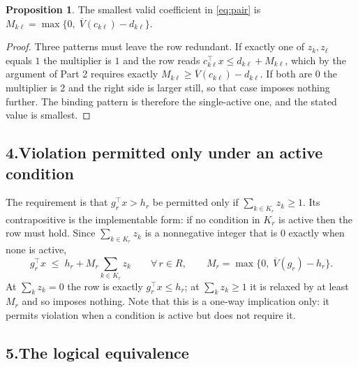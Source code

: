 \documentclass[11pt]{article}
\theoremstyle{definition}\newtheorem*{definition}{Definition}
\newtheorem{proposition}{Proposition}
\theoremstyle{definition}
\begin{document}
\begin{proposition}
The smallest valid coefficient in \eqref{eq:pair} is
$M_{k\ell} = \max\{0,\; \overline{V}(c_{k\ell}) - d_{k\ell}\}$.
\end{proposition}

\begin{proof}
Three patterns must leave the row redundant. If exactly one of
$z_k, z_\ell$ equals $1$ the multiplier is $1$ and the row reads
$c_{k\ell}^{\!\top}x \le d_{k\ell} + M_{k\ell}$, which by the argument of
Part 2 requires exactly $M_{k\ell} \ge \overline{V}(c_{k\ell}) -
d_{k\ell}$. If both are $0$ the multiplier is $2$ and the right side is
larger still, so that case imposes nothing further. The binding pattern
is therefore the single-active one, and the stated value is smallest.
\end{proof}

\subsection*{4.\quad Violation permitted only under an active condition}

The requirement is that $g_r^{\!\top} x > h_r$ be permitted only if
$\sum_{k \in K_r} z_k \ge 1$. Its contrapositive is the implementable
form: if no condition in $K_r$ is active then the row must hold. Since
$\sum_{k\in K_r} z_k$ is a nonnegative integer that is $0$ exactly when
none is active,
\begin{equation}
  g_r^{\!\top} x \;\le\; h_r
    + M_r \sum_{k \in K_r} z_k
  \qquad \forall\, r \in R,
  \qquad
  M_r = \max\big\{0,\; \overline{V}(g_r) - h_r \big\} .
  \label{eq:cover}
\end{equation}
At $\sum_k z_k = 0$ the row is exactly $g_r^{\!\top}x \le h_r$; at
$\sum_k z_k \ge 1$ it is relaxed by at least $M_r$ and so imposes
nothing. Note that this is a one-way implication only: it permits
violation when a condition is active but does not require it.

\subsection*{5.\quad The logical equivalence}
\end{document}
